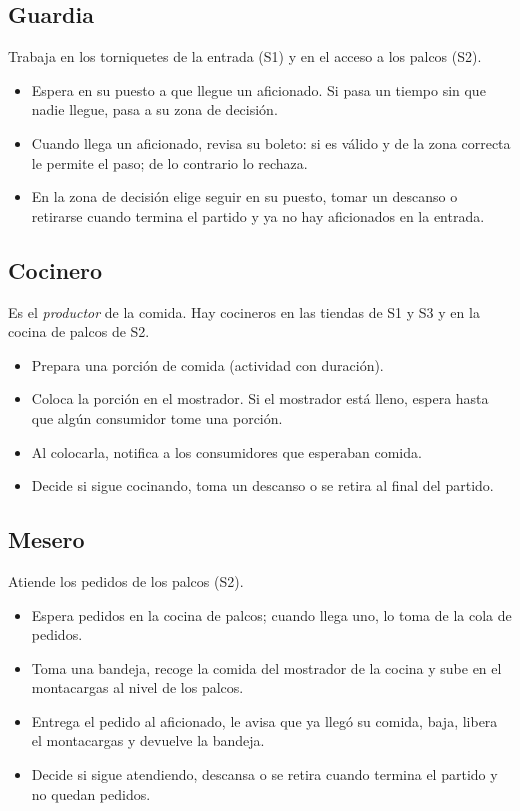 \documentclass[11pt,letterpaper]{article}
\begin{document}
\subsection{Guardia}
Trabaja en los torniquetes de la entrada (S1) y en el acceso a los palcos (S2).
\begin{itemize}
  \item Espera en su puesto a que llegue un aficionado. Si pasa un tiempo sin que nadie llegue, pasa a su zona de decisión.
  \item Cuando llega un aficionado, revisa su boleto: si es válido y de la zona correcta le permite el paso; de lo contrario lo rechaza.
  \item En la zona de decisión elige seguir en su puesto, tomar un descanso o retirarse cuando termina el partido y ya no hay aficionados en la entrada.
\end{itemize}

\subsection{Cocinero}
Es el \emph{productor} de la comida. Hay cocineros en las tiendas de S1 y S3 y en la cocina de palcos de S2.
\begin{itemize}
  \item Prepara una porción de comida (actividad con duración).
  \item Coloca la porción en el mostrador. Si el mostrador está lleno, espera hasta que algún consumidor tome una porción.
  \item Al colocarla, notifica a los consumidores que esperaban comida.
  \item Decide si sigue cocinando, toma un descanso o se retira al final del partido.
\end{itemize}

\subsection{Mesero}
Atiende los pedidos de los palcos (S2).
\begin{itemize}
  \item Espera pedidos en la cocina de palcos; cuando llega uno, lo toma de la cola de pedidos.
  \item Toma una bandeja, recoge la comida del mostrador de la cocina y sube en el montacargas al nivel de los palcos.
  \item Entrega el pedido al aficionado, le avisa que ya llegó su comida, baja, libera el montacargas y devuelve la bandeja.
  \item Decide si sigue atendiendo, descansa o se retira cuando termina el partido y no quedan pedidos.
\end{itemize}
\end{document}
